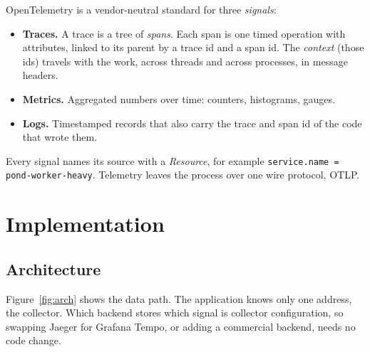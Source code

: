 \documentclass[manuscript,screen,review]{acmart}
\begin{document}
OpenTelemetry is a vendor-neutral standard for three \emph{signals}:
\begin{itemize}
  \item \textbf{Traces.} A trace is a tree of \emph{spans}. Each span is one timed
    operation with attributes, linked to its parent by a trace id and a span id. The
    \emph{context} (those ids) travels with the work, across threads and across
    processes, in message headers.
  \item \textbf{Metrics.} Aggregated numbers over time: counters, histograms, gauges.
  \item \textbf{Logs.} Timestamped records that also carry the trace and span id of the
    code that wrote them.
\end{itemize}
Every signal names its source with a \emph{Resource}, for example
\texttt{service.name = pond-worker-heavy}. Telemetry leaves the process over one wire
protocol, OTLP.

\section{Implementation}
\subsection{Architecture}
Figure~\ref{fig:arch} shows the data path. The application knows only one address, the
collector. Which backend stores which signal is collector configuration, so swapping
Jaeger for Grafana Tempo, or adding a commercial backend, needs no code change.
\end{document}
